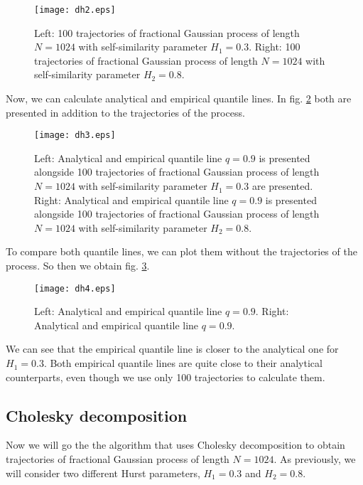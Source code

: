 \documentclass[12pt,titlepage]{article}
\begin{document}
\begin{figure}[H]
  
  \centering
    \texttt{[image: dh2.eps]}
  \caption{\footnotesize 
  Left: 100 trajectories of fractional Gaussian process of length $N=1024$ with self-similarity parameter $H_1=0.3$.
  Right: 100 trajectories of fractional Gaussian process of length $N=1024$ with self-similarity parameter $H_2=0.8$.
  }
  \label{dh2}
\end{figure}


Now, we can calculate analytical and empirical quantile lines. In fig. \ref{dh3} both are presented in addition to the trajectories of the process.

\begin{figure}[H]
  
  \centering
    \texttt{[image: dh3.eps]}
  \caption{\footnotesize 
  Left: Analytical and empirical quantile line $q=0.9$ is presented alongside 
  100 trajectories of fractional Gaussian process of length $N=1024$ with self-similarity parameter $H_1=0.3$ are presented.
  Right: Analytical and empirical quantile line $q=0.9$ is presented alongside 
  100 trajectories of fractional Gaussian process of length $N=1024$ with self-similarity parameter $H_2=0.8$.
  }
  \label{dh3}
\end{figure}

To compare both quantile lines, we can plot them without the trajectories of the process. So then we obtain fig. \ref{dh4}.

\begin{figure}[H]
  
  \centering
    \texttt{[image: dh4.eps]}
  \caption{\footnotesize 
  Left: Analytical and empirical quantile line $q=0.9$.
  Right: Analytical and empirical quantile line $q=0.9$.
  }
  \label{dh4}
\end{figure}

We can see that the empirical quantile line is closer to the analytical one for $H_1 = 0.3$. Both empirical quantile lines are quite close to their analytical counterparts, even though we use only 100 trajectories to calculate them.






\subsection{Cholesky decomposition}
 Now we will go the the algorithm that uses Cholesky decomposition to obtain trajectories of fractional Gaussian process of length $N=1024$. As previously, we will consider two different Hurst parameters, $H_1=0.3$ and $H_2 = 0.8$.
\end{document}
